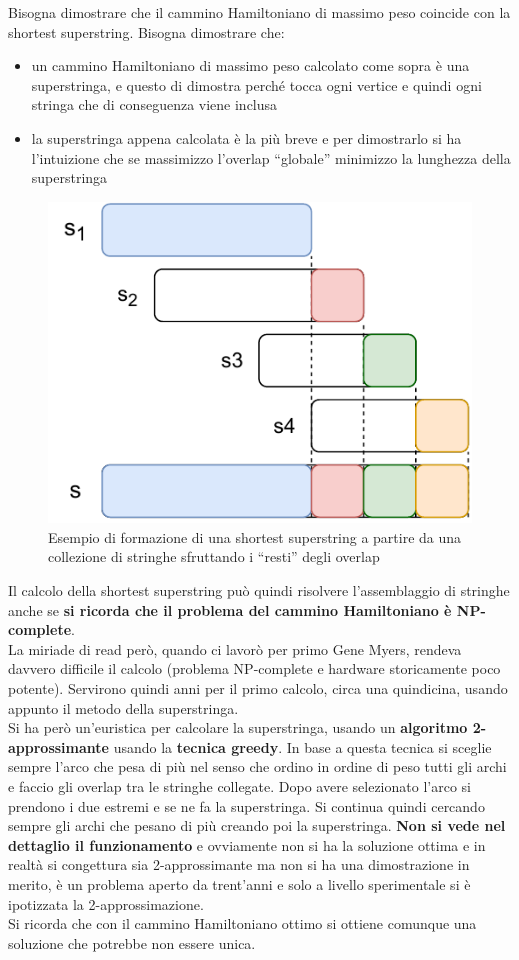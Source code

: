 \documentclass[a4paper,12pt, oneside]{book}
\begin{document}
Bisogna dimostrare che il cammino Hamiltoniano di massimo peso coincide con la
shortest superstring. Bisogna dimostrare che:
\begin{itemize}
  \item un cammino Hamiltoniano di massimo peso calcolato come sopra è una
  superstringa, e questo di dimostra perché tocca ogni vertice e quindi ogni
  stringa che di conseguenza viene inclusa
  \item la superstringa appena calcolata è la più breve e per dimostrarlo si ha
  l'intuizione che se massimizzo l'overlap ``globale'' minimizzo la lunghezza
  della superstringa 
\end{itemize}
\begin{figure}
  \centering
  \includegraphics[scale = 0.8]{img/ssp.pdf}
  \caption{Esempio di formazione di una shortest superstring a partire da una
    collezione di stringhe sfruttando i ``resti'' degli overlap}
  \label{fig:ssp}
\end{figure}
Il calcolo della shortest superstring può quindi risolvere l'assemblaggio di
stringhe anche se \textbf{si ricorda che il problema del cammino Hamiltoniano è
  NP-complete}. \\
La miriade di read però, quando ci lavorò per primo Gene Myers, rendeva
davvero difficile il calcolo (problema NP-complete e hardware storicamente poco
potente). Servirono quindi anni per il primo calcolo, circa una quindicina,
usando appunto il metodo della superstringa.\\
Si ha però un'euristica per calcolare la superstringa, usando un
\textbf{algoritmo 2-approssimante} usando la \textbf{tecnica greedy}. In base a
questa tecnica si sceglie sempre l'arco che pesa di più nel senso che ordino in
ordine di peso tutti gli archi e faccio gli overlap tra le stringhe collegate.
Dopo avere selezionato l'arco si prendono i due estremi e se ne fa la
superstringa. Si continua quindi cercando sempre gli archi che pesano di più
creando poi la superstringa. \textbf{Non si vede nel dettaglio il funzionamento}
e ovviamente non si ha la soluzione ottima e in realtà si congettura sia
2-approssimante ma non si ha una dimostrazione in merito, è un problema aperto
da trent'anni e solo a livello sperimentale si è ipotizzata la
2-approssimazione.\\
Si ricorda che con il cammino Hamiltoniano ottimo si ottiene comunque una
soluzione che potrebbe non essere unica.
\end{document}
